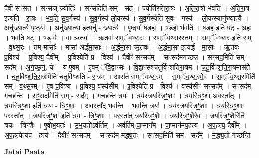\documentclass[17pt]{extarticle}
\begin{document}
दैवी॑ सꣳ॒॒सत् । सꣳ॒॒सज् ज्योतिः॑ । सꣳ॒॒सदिति॑ सम् - सत् । ज्योति॑रतिरा॒त्रः । अ॒ति॒रा॒त्रो भ॑वति । अ॒ति॒रा॒त्र इत्य॑ति - रा॒त्रः । भ॒व॒ति॒ सु॒व॒र्गस्य॑ । सु॒व॒र्गस्य॑ लो॒कस्य॑ । सु॒व॒र्गस्येति॑ सुवः - गस्य॑ । लो॒कस्यानु॑ख्यात्यै । अनु॑ख्यात्यै॒ पृष्ठ्‍यः॑ । अनु॑ख्यात्या॒ इत्यनु॑ - ख्या॒त्यै॒ । पृष्ठ्‍यः॑ षड॒हः । ष॒ड॒हो भ॑वति । ष॒ड॒ह इति॑ षट् - अ॒हः । भ॒व॒ति॒ षट् । षड् वै । वा ऋ॒तवः॑ । ऋ॒तवः॑ सम्ॅवथ्स॒रः । स॒म्ॅव॒थ्स॒रस्तम् । स॒म्ॅव॒थ्स॒र इति॑ सम् - व॒थ्स॒रः । तम् मासाः᳚ । मासा॑ अर्द्धमा॒साः । अ॒र्द्ध॒मा॒सा ऋ॒तवः॑ । अ॒र्द्ध॒मा॒सा इत्य॑र्द्ध - मा॒साः । ऋ॒तवः॑ प्र॒विश्य॑ । प्र॒विश्य॒ दैवी᳚म् । प्र॒विश्येति॑ प्र - विश्य॑ । दैवीꣳ॑ सꣳ॒॒सद᳚म् । सꣳ॒॒सद॑मगच्छन्न् । सꣳ॒॒सद॒मिति॑ सम् - सद᳚म् । अ॒ग॒च्छ॒न्॒. ये । य ए॒वम् । ए॒वम् ॅवि॒द्वाꣳसः॑ । वि॒द्वाꣳस॑श्चतुर्विꣳशतिरा॒त्रम् । च॒तु॒र्विꣳ॒॒श॒ति॒रा॒त्रमास॑ते । च॒तु॒र्विꣳ॒॒श॒ति॒रा॒त्रमिति॑ चतुर्विꣳशति - रा॒त्रम् । आस॑ते सम्ॅवथ्स॒रम् । स॒म्ॅव॒थ्स॒रमे॒व । स॒म्ॅव॒थ्स॒रमिति॑ सम् - व॒थ्स॒रम् । ए॒व प्र॒विश्य॑ । प्र॒विश्य॒ वस्य॑सीम् । प्र॒विश्येति॑ प्र - विश्य॑ । वस्य॑सीꣳ सꣳ॒॒सद᳚म् । सꣳ॒॒सद॑म् गच्छन्ति । सꣳ॒॒सद॒मिति॑ सम् - सद᳚म् । ग॒च्छ॒न्ति॒ त्रयः॑ । त्रय॑स्त्रयस्त्रिꣳ॒॒शाः । त्र॒य॒स्त्रिꣳ॒॒शा अ॒वस्ता᳚त् । त्र॒य॒स्त्रिꣳ॒॒शा इति॑ त्रयः - त्रिꣳ॒॒शाः । अ॒वस्ता᳚द् भवन्ति । भ॒व॒न्ति॒ त्रयः॑ । त्रय॑स्त्रयस्त्रिꣳ॒॒शाः । त्र॒य॒स्त्रिꣳ॒॒शाः प॒रस्ता᳚त् । त्र॒य॒स्त्रिꣳ॒॒शा इति॑ त्रयः - त्रिꣳ॒॒शाः । प॒रस्ता᳚त् त्रयस्त्रिꣳ॒॒शैः । त्र॒य॒स्त्रिꣳ॒॒शैरे॒व । त्र॒य॒स्त्रिꣳ॒॒शैरिति॑ त्रयः - त्रिꣳ॒॒शैः । ए॒वोभ॒यतः॑ । उ॒भ॒यतोऽव॑र्तिम् । अव॑र्तिम् पा॒प्मान᳚म् । पा॒प्मान॑मप॒हत्य॑ । अ॒प॒हत्य॒ दैवी᳚म् । अ॒प॒हत्येत्य॑प - हत्य॑ । दैवीꣳ॑ सꣳ॒॒सद᳚म् । सꣳ॒॒सद॑म् मद्ध्य॒तः । सꣳ॒॒सद॒मिति॑ सम् - सद᳚म् । म॒द्ध्य॒तो ग॑च्छन्ति \newline

\textbf{Jatai Paata} \newline
\end{document}
